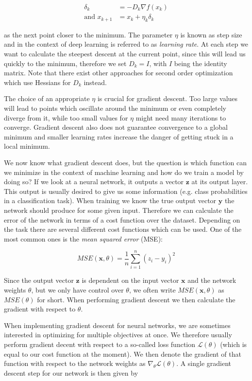 \begin{align*}
  \delta_k &= -D_k \nabla f(x_k) \\
  \text{and } x_{k+1} &= x_k + \eta_k \delta_k
\end{align*}

as the next point closer to the minimum. The parameter $\eta$ is known as step size and in the context of deep learning is referred to as \textit{learning rate}. At each step we want to calculate the steepest descent at the current point, since this will lead us quickly to the minimum, therefore we set $D_k = I$, with $I$ being the identity matrix. Note that there exist other approaches for second order optimization which use Hessians for $D_k$ instead.

The choice of an appropriate $\eta$ is crucial for gradient descent. Too large values will lead to points which oscillate around the minimum or even completely diverge from it, while too small values for $\eta$ might need many iterations to converge. Gradient descent also does not guarantee convergence to a global minimum and smaller learning rates increase the danger of getting stuck in a local minimum.

We now know what gradient descent does, but the question is which function can we minimize in the context of machine learning and how do we train a model by doing so? If we look at a neural network, it outputs a vector $\mathbf{z}$ at its output layer. This output is usually desired to give us some information (e.g. class probabilities in a classification task). When training we know the true output vector $\mathbf{y}$ the network should produce for some given input. Therefore we can calculate the error of the network in terms of a cost function over the dataset. Depending on the task there are several different cost functions which can be used. One of the most common ones is the \textit{mean squared error} (MSE):

\begin{equation*}
  MSE(\mathbf{x}, \theta) = \frac{1}{n} \sum^n_{i=1} (z_i - y_i)^2
\end{equation*}

Since the output vector $\mathbf{z}$ is dependent on the input vector $\mathbf{x}$ and the network weights $\theta$, but we only have control over $\theta$, we often write $MSE(\mathbf{x}, \theta)$ as $MSE(\theta)$ for short. When performing gradient descent we then calculate the gradient with respect to $\theta$. 

When implementing gradient descent for neural networks, we are sometimes interested in optimizing for multiple objectives at once. We therefore usually perform gradient decent with respect to a so-called loss function $\mathcal{L}(\theta)$ (which is equal to our cost function at the moment). We then denote the gradient of that function with respect to the network weights as $\nabla_\theta \mathcal{L}(\theta)$. A single gradient descent step for our network is then given by

